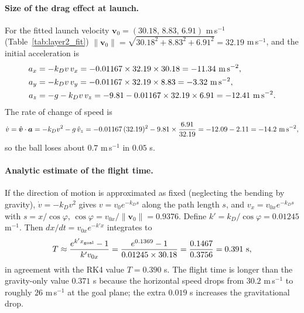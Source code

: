 \documentclass[11pt,a4paper]{article}
\begin{document}
\paragraph{Size of the drag effect at launch.}
For the fitted launch velocity $\bm v_0=(30.18,\,8.83,\,6.91)$ m\,s$^{-1}$ (Table~\ref{tab:layer2_fit}) $\|\bm v_0\|=\sqrt{30.18^2+8.83^2+6.91^2}=32.19$ m\,s$^{-1}$, and the initial acceleration is
\begin{align}
    a_x&=-k_D v\,v_x=-0.01167\times32.19\times30.18=-11.34\ {\rm m\,s^{-2}},\\
    a_y&=-k_D v\,v_y=-0.01167\times32.19\times8.83=-3.32\ {\rm m\,s^{-2}},\\
    a_z&=-g-k_D v\,v_z=-9.81-0.01167\times32.19\times6.91=-12.41\ {\rm m\,s^{-2}}.
\end{align}
The rate of change of speed is
\begin{equation}
    \dot v=\hat{\bm v}\cdot\bm a=-k_Dv^2-g\,\hat v_z
    =-0.01167\,(32.19)^2-9.81\times\frac{6.91}{32.19}
    =-12.09-2.11=-14.2\ {\rm m\,s^{-2}},
\end{equation}
so the ball loses about $0.7$ m\,s$^{-1}$ in $0.05$ s.

\paragraph{Analytic estimate of the flight time.}
If the direction of motion is approximated as fixed (neglecting the bending by gravity), $\dot v=-k_Dv^2$ gives $v=v_0e^{-k_Ds}$ along the path length $s$, and $v_x=v_{0x}e^{-k_Ds}$ with $s=x/\cos\varphi$, $\cos\varphi=v_{0x}/\|\bm v_0\|=0.9376$. Define $k'=k_D/\cos\varphi=0.01245$ m$^{-1}$. Then $dx/dt=v_{0x}e^{-k'x}$ integrates to
\begin{equation}
    T\approx\frac{e^{k'x_{\rm goal}}-1}{k'v_{0x}}
    =\frac{e^{0.1369}-1}{0.01245\times30.18}=\frac{0.1467}{0.3756}=0.391\ {\rm s},
\end{equation}
in agreement with the RK4 value $T=0.390$ s. The flight time is longer than the gravity-only value $0.371$ s because the horizontal speed drops from $30.2$ m\,s$^{-1}$ to roughly $26$ m\,s$^{-1}$ at the goal plane; the extra $0.019$ s increases the gravitational drop.
\end{document}
